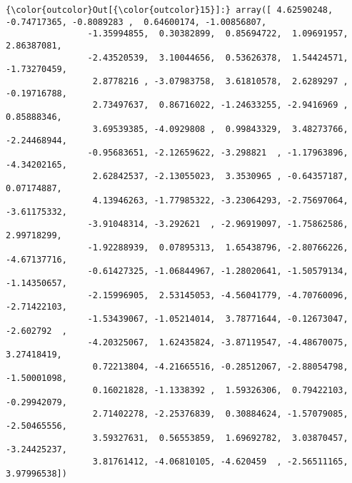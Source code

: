 \documentclass[11pt]{article}
\begin{document}
\begin{Verbatim}[commandchars=\\\{\}]
{\color{outcolor}Out[{\color{outcolor}15}]:} array([ 4.62590248, -0.74717365, -0.8089283 ,  0.64600174, -1.00856807,
                -1.35994855,  0.30382899,  0.85694722,  1.09691957,  2.86387081,
                -2.43520539,  3.10044656,  0.53626378,  1.54424571, -1.73270459,
                 2.8778216 , -3.07983758,  3.61810578,  2.6289297 , -0.19716788,
                 2.73497637,  0.86716022, -1.24633255, -2.9416969 ,  0.85888346,
                 3.69539385, -4.0929808 ,  0.99843329,  3.48273766, -2.24468944,
                -0.95683651, -2.12659622, -3.298821  , -1.17963896, -4.34202165,
                 2.62842537, -2.13055023,  3.3530965 , -0.64357187,  0.07174887,
                 4.13946263, -1.77985322, -3.23064293, -2.75697064, -3.61175332,
                -3.91048314, -3.292621  , -2.96919097, -1.75862586,  2.99718299,
                -1.92288939,  0.07895313,  1.65438796, -2.80766226, -4.67137716,
                -0.61427325, -1.06844967, -1.28020641, -1.50579134, -1.14350657,
                -2.15996905,  2.53145053, -4.56041779, -4.70760096, -2.71422103,
                -1.53439067, -1.05214014,  3.78771644, -0.12673047, -2.602792  ,
                -4.20325067,  1.62435824, -3.87119547, -4.48670075,  3.27418419,
                 0.72213804, -4.21665516, -0.28512067, -2.88054798, -1.50001098,
                 0.16021828, -1.1338392 ,  1.59326306,  0.79422103, -0.29942079,
                 2.71402278, -2.25376839,  0.30884624, -1.57079085, -2.50465556,
                 3.59327631,  0.56553859,  1.69692782,  3.03870457, -3.24425237,
                 3.81761412, -4.06810105, -4.620459  , -2.56511165,  3.97996538])
\end{Verbatim}
            
\end{document}
